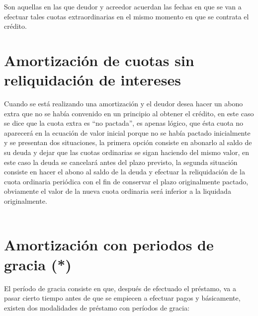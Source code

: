 Son aquellas en las que deudor y acreedor acuerdan las fechas en que se van a efectuar tales cuotas extraordinarias en el mismo momento en que se contrata el crédito.\\




\section{Amortización de cuotas sin reliquidación de intereses }
Cuando se está realizando una amortización y el deudor desea hacer un abono extra que no se había convenido en un principio al obtener el crédito, en este caso se dice que la cuota extra es “no pactada”, es apenas lógico, que ésta cuota no aparecerá en la ecuación de valor inicial porque no se había pactado inicialmente y se presentan dos situaciones, la primera opción consiste en abonarlo al saldo de su deuda y dejar que las cuotas ordinarias se sigan haciendo del mismo valor, en este caso la deuda se cancelará antes del plazo previsto, la segunda situación consiste en hacer el abono al saldo de la deuda y efectuar la reliquidación de la cuota ordinaria periódica con el fin de conservar el plazo originalmente pactado, obviamente el valor de la nueva cuota ordinaria será inferior a la liquidada originalmente.
\\\\



\section{Amortización con periodos de gracia (*)}
El período de gracia consiste en que, después de efectuado el préstamo, va a pasar cierto tiempo antes de que se empiecen a efectuar pagos y básicamente, existen dos modalidades de préstamo con períodos de gracia:\\

